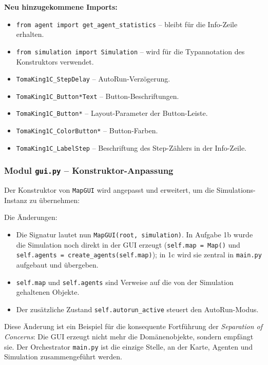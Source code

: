\textbf{Neu hinzugekommene Imports:}
\begin{itemize}
    \item \texttt{from agent import get\_agent\_statistics} – bleibt für die Info-Zeile erhalten.
    \item \texttt{from simulation import Simulation} – wird für die Typannotation des Konstruktors verwendet.
    \item \texttt{TomaKing1C\_StepDelay} – AutoRun-Verzögerung.
    \item \texttt{TomaKing1C\_Button*Text} – Button-Beschriftungen.
    \item \texttt{TomaKing1C\_Button*} – Layout-Parameter der Button-Leiste.
    \item \texttt{TomaKing1C\_ColorButton*} – Button-Farben.
    \item \texttt{TomaKing1C\_LabelStep} – Beschriftung des Step-Zählers in der Info-Zeile.
\end{itemize}


\subsubsection{Modul \texttt{gui.py} – Konstruktor-Anpassung}

Der Konstruktor von \texttt{MapGUI} wird angepasst und erweitert, um die Simulations-Instanz zu übernehmen:



Die Änderungen:
\begin{itemize}
    \item Die Signatur lautet nun \texttt{MapGUI(root, simulation)}. In Aufgabe 1b wurde die Simulation noch direkt in der \acs{GUI} erzeugt (\texttt{self.map = Map()} und \texttt{self.agents = create\_agents(self.map)}); in 1c wird sie zentral in \texttt{main.py} aufgebaut und übergeben.
    \item \texttt{self.map} und \texttt{self.agents} sind Verweise auf die von der Simulation gehaltenen Objekte.
    \item Der zusätzliche Zustand \texttt{self.autorun\_active} steuert den AutoRun-Modus.
\end{itemize}

Diese Änderung ist ein Beispiel für die konsequente Fortführung der \textit{Separation of Concerns}: Die \acs{GUI} erzeugt nicht mehr die Domänenobjekte, sondern empfängt sie. Der Orchestrator \texttt{main.py} ist die einzige Stelle, an der Karte, Agenten und Simulation zusammengeführt werden.

